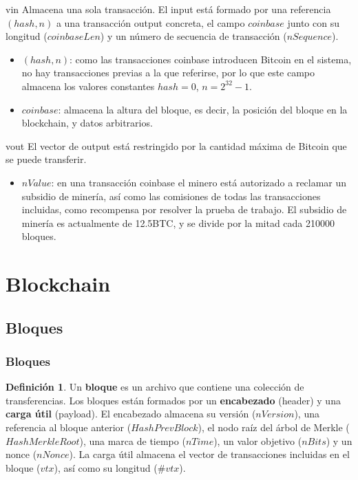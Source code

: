 \documentclass{beamer}
\theoremstyle{definition}
\newtheorem{defi}{Definición}
\begin{document}
\begin{frame}
	\begin{block}{vin}
		Almacena una sola transacción. El input está formado por una referencia $(hash, n)$ a una transacción output concreta, el campo $coinbase$ junto con su longitud ($coinbaseLen$) y un número de secuencia de transacción ($nSequence$).
	\end{block}
\end{frame}

\begin{frame}
	\begin{itemize}
		\item<1-> $(hash,n)$: como las transacciones coinbase introducen Bitcoin en el sistema, no hay transacciones previas a la que referirse, por lo que este campo almacena los valores constantes $hash=0$, $n=2^{32}-1$. 
		\item<2-> $coinbase$: almacena la altura del bloque, es decir, la posición del bloque en la blockchain, y datos arbitrarios. 
	\end{itemize}

\end{frame}

\begin{frame}
	\begin{block}{vout}
		El vector de output está restringido por la cantidad máxima de Bitcoin que se puede transferir.
	\end{block}\pause

\begin{itemize}
	\item $nValue$: en una transacción coinbase el minero está autorizado a reclamar un subsidio de minería, así como las comisiones de todas las transacciones incluidas, como recompensa por resolver la prueba de trabajo. El subsidio de minería es actualmente de 12.5BTC, y se divide por la mitad cada 210000 bloques. 
\end{itemize}

\end{frame}

\section{Blockchain}
\subsection{Bloques}
\begin{frame}
	\frametitle{Bloques}
	\begin{defi}
		Un \textbf{bloque} es un archivo que contiene una colección de transferencias. Los bloques están formados por un \textbf{encabezado} (header) y una \textbf{carga útil} (payload). El encabezado almacena su versión ($nVersion$), una referencia al bloque anterior ($HashPrevBlock$), el nodo raíz del árbol de Merkle ($HashMerkleRoot$), una marca de tiempo ($nTime$), un valor objetivo ($nBits$) y un nonce ($nNonce$). La carga útil almacena el vector de transacciones incluidas en el bloque ($vtx$), así como su longitud ($\# vtx$).
	\end{defi}
\end{frame}
\end{document}
